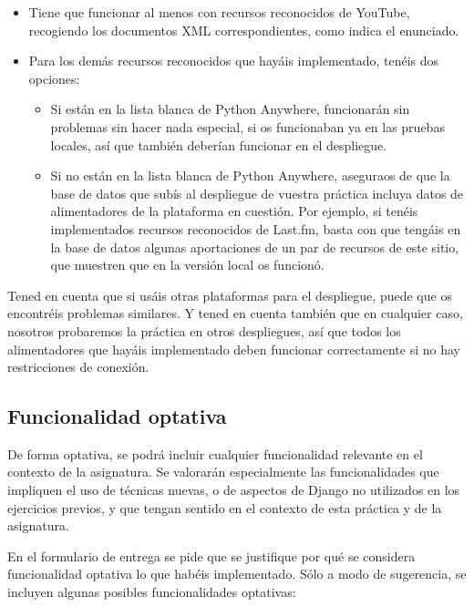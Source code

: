 \begin{itemize}
\item Tiene que funcionar al menos con recursos reconocidos de YouTube, recogiendo los documentos XML correspondientes, como indica el enunciado.
\item Para los demás recursos reconocidos que hayáis implementado, tenéis dos opciones:
  \begin{itemize}
  \item Si están en la lista blanca de Python Anywhere, funcionarán sin problemas sin hacer nada especial, si os funcionaban ya en las pruebas locales, así que también deberían funcionar en el despliegue.
  \item Si no están en la lista blanca de Python Anywhere, aseguraos de que la base de datos que subís al despliegue de vuestra práctica incluya datos de alimentadores de la plataforma en cuestión. Por ejemplo, si tenéis implementados recursos reconocidos de Last.fm, basta con que tengáis en la base de datos algunas aportaciones de un par de recursos de este sitio, que muestren que en la versión local os funcionó.
  \end{itemize}
\end{itemize}

Tened en cuenta que si usáis otras plataformas para el despliegue, puede que os encontréis problemas similares. Y tened en cuenta también que en cualquier caso, nosotros probaremos la práctica en otros despliegues, así que todos los alimentadores que hayáis implementado deben funcionar correctamente si no hay restricciones de conexión.

\subsection{Funcionalidad optativa}

De forma optativa, se podrá incluir cualquier funcionalidad relevante en el contexto de la asignatura. Se valorarán especialmente las funcionalidades que impliquen el uso de técnicas nuevas, o de aspectos de Django no utilizados en los ejercicios previos, y que tengan sentido en el contexto de esta práctica y de la asignatura.

En el formulario de entrega se pide que se justifique por qué se considera funcionalidad optativa lo que habéis implementado. Sólo a modo de sugerencia, se incluyen algunas posibles funcionalidades optativas:

